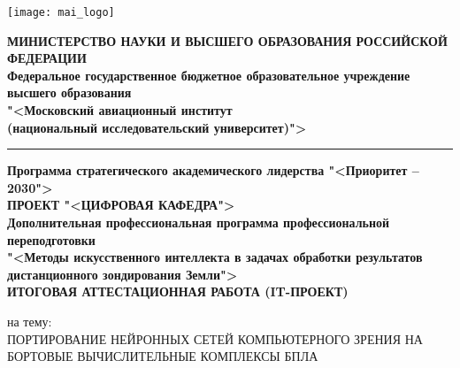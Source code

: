 \thispagestyle{empty}

\begin{center}

    \noindent
    \begin{minipage}{0.15\textwidth}
        \texttt{[image: mai\_logo]}
    \end{minipage}%
    \hfill
    \begin{minipage}{0.6\textwidth}\centering
        \textbf{МИНИСТЕРСТВО НАУКИ И ВЫСШЕГО ОБРАЗОВАНИЯ РОССИЙСКОЙ ФЕДЕРАЦИИ \\
        Федеральное государственное бюджетное образовательное учреждение высшего образования \\
        "<Московский авиационный институт \\
        (национальный исследовательский университет)">}
    \end{minipage}

    \vspace{3.0pt}
    \noindent\rule{\textwidth}{2pt}
    \vspace{3.0pt}

    \textbf{{\fontsize{12}{12}\selectfont
        Программа стратегического академического лидерства "<Приоритет – 2030">
    }} \\
    \vspace{2.0pt}
    \textbf{{\fontsize{12}{12}\selectfont
        ПРОЕКТ "<ЦИФРОВАЯ КАФЕДРА">
    }} \\
    \vspace{5.0pt}
    \textbf{{\fontsize{12}{12}\selectfont
        Дополнительная профессиональная программа профессиональной переподготовки
    }} \\
    \textbf{{\fontsize{12}{12}\selectfont
        "<Методы искусственного интеллекта в задачах обработки результатов дистанционного зондирования Земли">
    }} \\
    \vspace{5.0pt}
    \textbf{{\fontsize{16}{16}\selectfont
        ИТОГОВАЯ АТТЕСТАЦИОННАЯ РАБОТА (IT-ПРОЕКТ)
    }}

\end{center}


\begin{center}

    на тему: \\
    \uppercase{Портирование нейронных сетей компьютерного зрения на бортовые вычислительные комплексы БПЛА}
    
\end{center}

